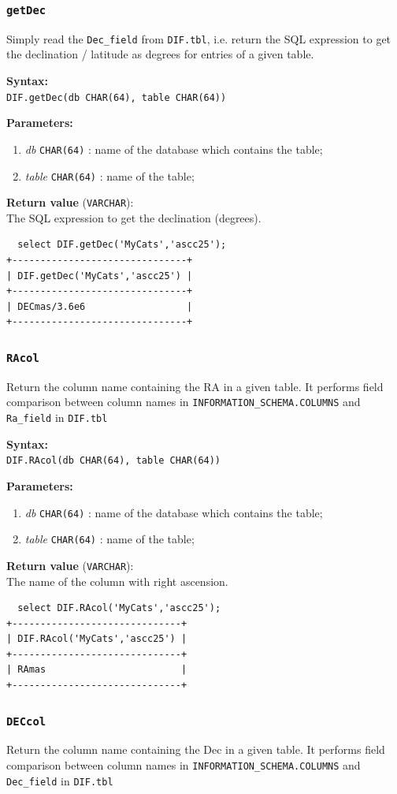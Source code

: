 \documentclass[10pt,titlepage]{article}
\newcommand{\syntax}[1]
{
  \bigskip
  \noindent
  \textbf{Syntax:} \\ 
  \indent \texttt{#1}
}
\newenvironment{parameters}
{
  \medskip
  \noindent
  \textbf{Parameters:}
  \begin{enumerate}
}
{
  \end{enumerate}
}
\newcommand{\param}[2]
{
  \item \textit{#1} \texttt{#2} 
}
\newcommand{\return}[1]
{
  \medskip
  \noindent
  \textbf{Return value} (\texttt{#1}): \\
  \indent
}
\newcommand{\example}
{
\medskip
\noindent{\textbf{Example:}}
}
\begin{document}
\subsubsection{{\tt getDec}}
Simply read the \texttt{Dec\_field} from \texttt{DIF.tbl}, i.e. return the
SQL expression to get the declination / latitude as degrees for
entries of a given table.

\syntax{DIF.getDec(db CHAR(64), table CHAR(64))}

\begin{parameters}
  \param{db}{CHAR(64)}: name of the database which contains the table;
  \param{table}{CHAR(64)}: name of the table;
\end{parameters}

\return{VARCHAR} The SQL expression to get the declination (degrees).

\example
%
\begin{verbatim}
  select DIF.getDec('MyCats','ascc25');
+-------------------------------+
| DIF.getDec('MyCats','ascc25') |
+-------------------------------+
| DECmas/3.6e6                  |
+-------------------------------+
\end{verbatim}
%
%



\subsubsection{{\tt RAcol}}
Return the column name containing the RA in a given table.
It performs field comparison between column names in \texttt{INFORMATION\_SCHEMA.COLUMNS}
and \texttt{Ra\_field} in \texttt{DIF.tbl} 

\syntax{DIF.RAcol(db CHAR(64), table CHAR(64))}

\begin{parameters}
  \param{db}{CHAR(64)}: name of the database which contains the table;
  \param{table}{CHAR(64)}: name of the table;
\end{parameters}

\return{VARCHAR} The name of the column with right ascension.

\example
%
\begin{verbatim}
  select DIF.RAcol('MyCats','ascc25');
+------------------------------+
| DIF.RAcol('MyCats','ascc25') |
+------------------------------+
| RAmas                        |
+------------------------------+
\end{verbatim}
%
%

\subsubsection{{\tt DECcol}}
Return the column name containing the Dec in a given table.
It performs field comparison between column names in \texttt{INFORMATION\_SCHEMA.COLUMNS}
and \texttt{Dec\_field} in \texttt{DIF.tbl} 
\end{document}
